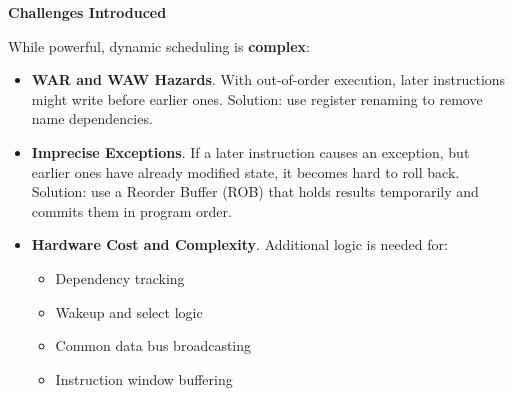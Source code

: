 \highspace
\begin{flushleft}
    \textcolor{Red2}{ \textbf{Challenges Introduced}}
\end{flushleft}
While powerful, dynamic scheduling is \textbf{complex}:
\begin{itemize}[label=\textcolor{Red2}{}]
    \item \textbf{WAR and WAW Hazards}. With out-of-order execution, later instructions might write before earlier ones. Solution: use register renaming to remove name dependencies.
    \item \textbf{Imprecise Exceptions}. If a later instruction causes an exception, but earlier ones have already modified state, it becomes hard to roll back. Solution: use a Reorder Buffer (ROB) that holds results temporarily and commits them in program order.
    \item \textbf{Hardware Cost and Complexity}. Additional logic is needed for:
    \begin{itemize}
        \item Dependency tracking
        \item Wakeup and select logic
        \item Common data bus broadcasting
        \item Instruction window buffering
    \end{itemize}
\end{itemize}